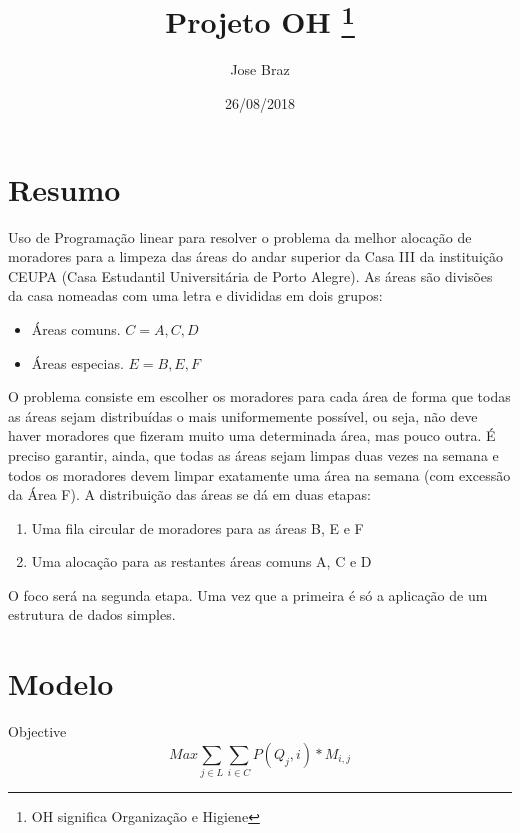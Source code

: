 \documentclass{article}
\begin{document}
    \title{Projeto OH \footnote{OH significa Organização e Higiene}}
    \author{Jose Braz}
    \date{26/08/2018}

    \maketitle

    \section{Resumo}

    Uso de Programação linear para resolver o problema da melhor alocação de
    moradores para a limpeza das áreas do andar superior da Casa III da instituição
    CEUPA (Casa Estudantil Universitária de Porto Alegre). As áreas são 
        divisões da casa nomeadas com uma letra e divididas em dois grupos:
        \begin{itemize}
            \item Áreas comuns. $C = {A, C, D}$
            \item Áreas especias. $E = {B, E, F}$
        \end{itemize}
    O problema consiste em escolher os moradores para cada área de forma 
    que todas as áreas sejam
    distribuídas o mais uniformemente possível, ou seja, não deve haver
    moradores que fizeram muito uma determinada área, mas pouco outra. É
    preciso garantir, ainda, que todas as áreas sejam limpas duas vezes na 
    semana e todos os moradores devem limpar exatamente uma área na semana 
    (com excessão da Área F). 
    A distribuição das áreas se dá em duas etapas:

    \begin{enumerate}
        \item Uma fila circular de moradores para as áreas B, E e F
        \item Uma alocação para as restantes áreas comuns A, C e D
    \end{enumerate}

    O foco será na segunda etapa. Uma vez que a primeira é só a aplicação
        de um estrutura de dados simples.

    \section{Modelo}

    Objective \\
    \begin{equation} \label{obj}
        Max \sum_{j \in L}{\sum_{i \in C}{P(Q_j, i) * M_{i,j}}}
    \end{equation}
\end{document}
